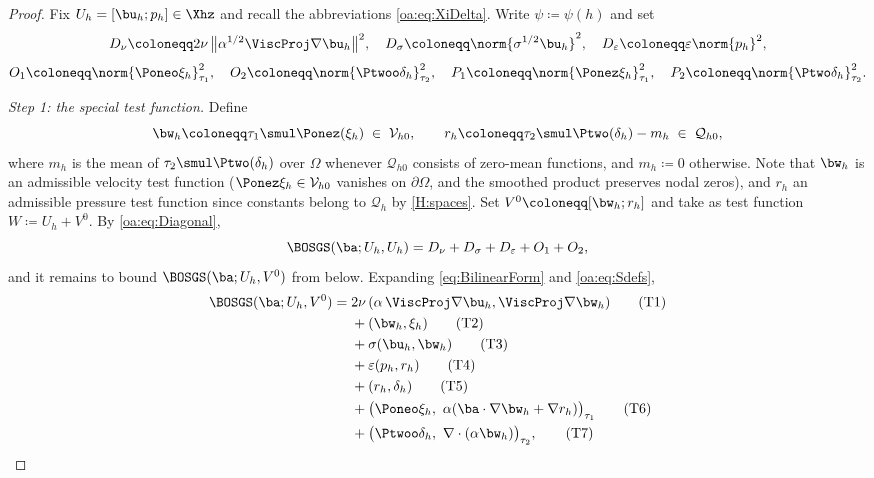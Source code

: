 \begin{proof}
Fix $U_h = [\bu_h; p_h] \in \Xhz$ and recall the abbreviations \cref{oa:eq:XiDelta}.
Write $\psi \coloneqq \psi(h)$ and set
\[
  D_\nu \coloneqq 2\nu\,\bigl\lVert \alpha^{1/2}\ViscProj\nabla\bu_h \bigr\rVert^2,
  \quad
  D_\sigma \coloneqq \norm{\sigma^{1/2}\bu_h}^2,
  \quad
  D_\varepsilon \coloneqq \varepsilon\norm{p_h}^2,
\]
\[
  O_1 \coloneqq \norm{\Poneo\xi_h}_{\tau_1}^2,
  \quad
  O_2 \coloneqq \norm{\Ptwoo\delta_h}_{\tau_2}^2,
  \quad
  P_1 \coloneqq \norm{\Ponez\xi_h}_{\tau_1}^2,
  \quad
  P_2 \coloneqq \norm{\Ptwo\delta_h}_{\tau_2}^2 .
\]

\medskip\noindent\emph{Step 1: the special test function.}
Define
\[
  \bw_h \coloneqq \tau_1 \smul \Ponez(\xi_h) \;\in\; \mathcal{V}_{h0},
  \qquad
  r_h \coloneqq \tau_2 \smul \Ptwo(\delta_h) - m_h \;\in\; \mathcal{Q}_{h0},
\]
where $m_h$ is the mean of $\tau_2\smul\Ptwo(\delta_h)$ over $\Omega$ whenever
$\mathcal{Q}_{h0}$ consists of zero-mean functions, and $m_h \coloneqq 0$ otherwise. Note that
$\bw_h$ is an admissible velocity test function ($\Ponez\xi_h \in \mathcal{V}_{h0}$ vanishes on
$\partial\Omega$, and the smoothed product preserves nodal zeros), and $r_h$ an
admissible pressure test function since constants belong to $\mathcal{Q}_h$ by \cref{H:spaces}. Set
$V^0 \coloneqq [\bw_h; r_h]$ and take as test function $W \coloneqq U_h + V^0$.
By \cref{oa:eq:Diagonal},
\begin{equation}
  \label{oa:eq:StepDiag}
  \BOSGS(\ba; U_h, U_h) = D_\nu + D_\sigma + D_\varepsilon + O_1 + O_2 ,
\end{equation}
and it remains to bound $\BOSGS(\ba; U_h, V^0)$ from below. Expanding
\cref{eq:BilinearForm} and \cref{oa:eq:Sdefs},
\begin{align}
  \BOSGS(\ba; U_h, V^0)
  ={}& 2\nu\,(\alpha\,\ViscProj\nabla\bu_h, \ViscProj\nabla\bw_h)
  \tag{T1}\label{oa:eq:T1}\\
  &+ (\bw_h, \xi_h)
  \tag{T2}\label{oa:eq:T2}\\
  &+ \sigma(\bu_h, \bw_h)
  \tag{T3}\label{oa:eq:T3}\\
  &+ \varepsilon(p_h, r_h)
  \tag{T4}\label{oa:eq:T4}\\
  &+ (r_h, \delta_h)
  \tag{T5}\label{oa:eq:T5}\\
  &+ \bigl(\Poneo\xi_h,\ \alpha(\ba\cdot\nabla\bw_h + \nabla r_h)\bigr)_{\tau_1}
  \tag{T6}\label{oa:eq:T6}\\
  &+ \bigl(\Ptwoo\delta_h,\ \nabla\cdot(\alpha\bw_h)\bigr)_{\tau_2},
  \tag{T7}\label{oa:eq:T7}
\end{align}

\end{proof}
